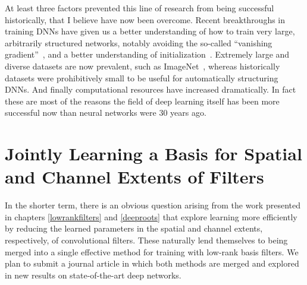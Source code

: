 \documentclass[thesis]{subfiles}
\begin{document}
At least three factors prevented this line of research from being successful historically, that I believe have now been overcome. Recent breakthroughs in training DNNs have given us a better understanding of how to train very large, arbitrarily structured networks, notably avoiding the so-called ``vanishing gradient''~\citep{Ioffe2015,He2016}, and a better understanding of initialization~\citep{He2015b}. Extremely large and diverse datasets are now prevalent, such as ImageNet~\citep{ILSVRC2015}, whereas historically datasets were prohibitively small to be useful for automatically structuring DNNs. And finally computational resources have increased dramatically. In fact these are most of the reasons the field of deep learning itself has been more successful now than neural networks were 30 years ago.

\section{Jointly Learning a Basis for Spatial and Channel Extents of Filters}
\label{journalplan}
In the shorter term, there is an obvious question arising from the work presented in chapters \ref{lowrankfilters} and \ref{deeproots} that explore learning more efficiently by reducing the learned parameters in the spatial and channel extents, respectively, of convolutional filters. These naturally lend themselves to being merged into a single effective method for training with low-rank basis filters. We plan to submit a journal article in which both methods are merged and explored in new results on state-of-the-art deep networks.


\end{document}
